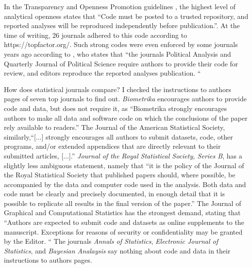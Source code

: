 In the Transparency and Openness Promotion guidelines \parencite{Nosek2015-hh}, the highest level of analytical openness states that ``Code must be posted to a trusted repository, and reported analyses will be reproduced independently before publication.''. At the time of writing, 26 journals adhered to this code according to https://topfactor.org/. Such strong codes were even enforced by some journals years ago according to \textcite{Nosek2015-hh}, who states that ``the journals Political Analysis and Quarterly Journal of Political Science require authors to provide their code for review, and editors reproduce the reported analyses publication. ``

How does statistical journals compare? I checked the instructions to authors pages of seven top journals to find out. \emph{Biometrika} encourages authors to provide code and data, but does not require it, as ``Biometrika strongly encourages authors to make all data and software code on which the conclusions of the paper rely available to readers.'' The Journal of the American Statistical Society, similarly,``[...] strongly encourages all authors to submit datasets, code, other programs, and/or extended appendices that are directly relevant to their submitted articles, [...].'' \emph{Journal of the Royal Statistical Society, Series B}, has a slightly less ambiguous statement, namely that ``it is the policy of the Journal of the Royal Statistical Society that published papers should, where possible, be accompanied by the data and computer code used in the analysis. Both data and code must be clearly and precisely documented, in enough detail that it is possible to replicate all results in the final version of the paper.'' The Journal of Graphical and Computational Statistics has the strongest demand, stating that ``Authors are expected to submit code and datasets as online supplements to the manuscript. Exceptions for reasons of security or confidentiality may be granted by the Editor. `` The journals \emph{Annals of Statistics}, \emph{Electronic Journal of Statistics}, and \emph{Bayesian Analaysis} say nothing about code and data in their instructions to authors pages.
